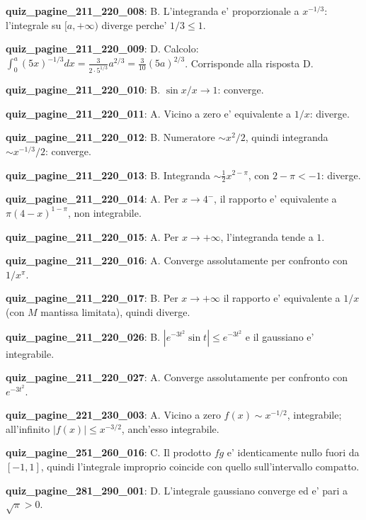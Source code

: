 \documentclass[11pt,a4paper]{article}
\newcounter{quiz}
\begin{document}
\noindent\textbf{quiz\_pagine\_211\_220\_008}: B. L'integranda e' proporzionale a $x^{-1/3}$: l'integrale su $[a,+\infty)$ diverge perche' $1/3\leq1$.\par\medskip
\noindent\textbf{quiz\_pagine\_211\_220\_009}: D. Calcolo: $\int_0^a(5x)^{-1/3}dx=\frac3{2\cdot5^{1/3}}a^{2/3}=\frac3{10}(5a)^{2/3}$. Corrisponde alla risposta D.\par\medskip
\noindent\textbf{quiz\_pagine\_211\_220\_010}: B. $\sin x/x\to1$: converge.\par\medskip
\noindent\textbf{quiz\_pagine\_211\_220\_011}: A. Vicino a zero e' equivalente a $1/x$: diverge.\par\medskip
\noindent\textbf{quiz\_pagine\_211\_220\_012}: B. Numeratore $\sim x^2/2$, quindi integranda $\sim x^{-1/3}/2$: converge.\par\medskip
\noindent\textbf{quiz\_pagine\_211\_220\_013}: B. Integranda $\sim\frac12 x^{2-\pi}$, con $2-\pi<-1$: diverge.\par\medskip
\noindent\textbf{quiz\_pagine\_211\_220\_014}: A. Per $x\to4^-$, il rapporto e' equivalente a $\pi(4-x)^{1-\pi}$, non integrabile.\par\medskip
\noindent\textbf{quiz\_pagine\_211\_220\_015}: A. Per $x\to+\infty$, l'integranda tende a $1$.\par\medskip
\noindent\textbf{quiz\_pagine\_211\_220\_016}: A. Converge assolutamente per confronto con $1/x^\pi$.\par\medskip
\noindent\textbf{quiz\_pagine\_211\_220\_017}: B. Per $x\to+\infty$ il rapporto e' equivalente a $1/x$ (con $M$ mantissa limitata), quindi diverge.\par\medskip
\noindent\textbf{quiz\_pagine\_211\_220\_026}: B. $|e^{-3t^2}\sin t|\leq e^{-3t^2}$ e il gaussiano e' integrabile.\par\medskip
\noindent\textbf{quiz\_pagine\_211\_220\_027}: A. Converge assolutamente per confronto con $e^{-3t^2}$.\par\medskip
\noindent\textbf{quiz\_pagine\_221\_230\_003}: A. Vicino a zero $f(x)\sim x^{-1/2}$, integrabile; all'infinito $|f(x)|\leq x^{-3/2}$, anch'esso integrabile.\par\medskip
\noindent\textbf{quiz\_pagine\_251\_260\_016}: C. Il prodotto $fg$ e' identicamente nullo fuori da $[-1,1]$, quindi l'integrale improprio coincide con quello sull'intervallo compatto.\par\medskip
\noindent\textbf{quiz\_pagine\_281\_290\_001}: D. L'integrale gaussiano converge ed e' pari a $\sqrt\pi>0$.\par\medskip
\end{document}
